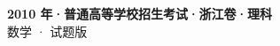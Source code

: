 \documentclass[zihao=-4, a4paper]{ctexart}
\begin{document}
\begin{center}
  {\Large\bfseries 2010 年·普通高等学校招生考试·浙江卷·理科}\\[4pt]
  {\large 数学 · 试题版}
\end{center}
\medskip
{}

\end{document}
